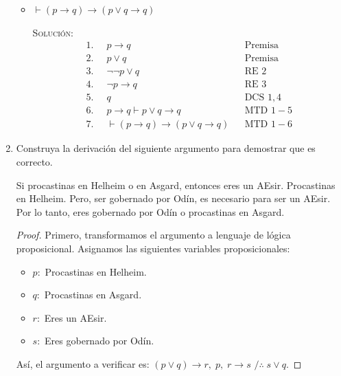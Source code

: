 \documentclass[letterpaper,11pt]{article}
\begin{document}
\begin{enumerate}
\begin{itemize}
        \item $⊢(p → q) → (p \lor q → q)$

        \textsc{Solución:}
        \begin{align*}
            1.& \; \; p → q
            && \text{Premisa} \\
            2.& \; \; p \lor q
            && \text{Premisa} \\
            3.& \; \; \neg \neg p \lor q
            && \text{RE $2$} \\ 
            4.& \; \; \neg p → q
            && \text{RE $3$} \\ 
            5.& \; \; q
            && \text{DCS $1, 4$} \\ 
            6.& \; \; p→ q \vdash p \lor q → q
            && \text{MTD $1 - 5$} \\ 
            7.& \; \; \vdash (p → q) → (p \lor q → q)
            && \text{MTD $1 - 6$}
        \end{align*}
    \end{itemize}

    \item Construya la derivación del siguiente argumento para demostrar que es 
    correcto.

    Si procastinas en Helheim o en Asgard, entonces eres un AEsir. Procastinas 
    en Helheim. Pero, ser gobernado por Odín, es necesario para ser un AEsir. 
    Por lo tanto, eres gobernado por Odín o procastinas en Asgard.

    \begin{proof}
        Primero, transformamos el argumento a lenguaje de lógica proposicional.
        Asignamos las siguientes variables proposicionales:

        \begin{itemize}
            \item $p:$ Procastinas en Helheim.
            \item $q:$ Procastinas en Asgard.
            \item $r:$ Eres un AEsir.
            \item $s:$ Eres gobernado por Odín.
        \end{itemize}

        Así, el argumento a verificar es: $(p \lor q) → r, \; p, \; r → s$
        $/∴ \; s \lor q$. 


\end{proof}
\end{enumerate}
\end{document}
